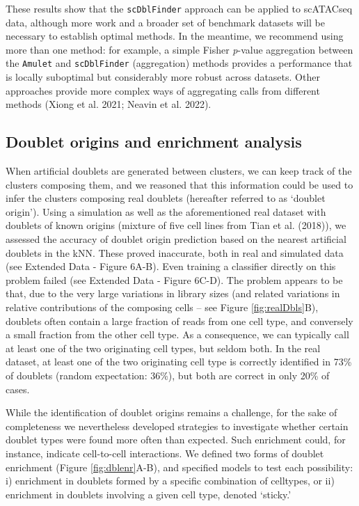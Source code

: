 \documentclass[10pt,a4paper,twocolumn]{article}
\begin{document}
These results show that the \texttt{scDblFinder} approach can be applied to scATACseq data, although more work and a broader set of benchmark datasets will be necessary to establish optimal methods. In the meantime, we recommend using more than one method: for example, a simple Fisher \emph{p}-value aggregation between the \texttt{Amulet} and \texttt{scDblFinder} (aggregation) methods provides a performance that is locally suboptimal but considerably more robust across datasets. Other approaches provide more complex ways of aggregating calls from different methods (Xiong et al. 2021; Neavin et al. 2022).


\subsection{Doublet origins and enrichment analysis}

When artificial doublets are generated between clusters, we can keep track of the clusters composing them, and we reasoned that this information could be used to infer the clusters composing real doublets (hereafter referred to as `doublet origin'). Using a simulation as well as the aforementioned real dataset with doublets of known origins (mixture of five cell lines from Tian et al. (2018)), we assessed the accuracy of doublet origin prediction based on the nearest artificial doublets in the kNN. These proved inaccurate, both in real and simulated data (see Extended Data - Figure 6A-B). Even training a classifier directly on this problem failed (see Extended Data - Figure 6C-D).
The problem appears to be that, due to the very large variations in library sizes (and related variations in relative contributions of the composing cells -- see Figure \ref{fig:realDbls}B), doublets often contain a large fraction of reads from one cell type, and conversely a small fraction from the other cell type.
As a consequence, we can typically call at least one of the two originating cell types, but seldom both.
In the real dataset, at least one of the two originating cell type is correctly identified in 73\% of doublets (random expectation: 36\%), but both are correct in only 20\% of cases.

While the identification of doublet origins remains a challenge, for the sake of completeness we nevertheless developed strategies to investigate whether certain doublet types were found more often than expected.
Such enrichment could, for instance, indicate cell-to-cell interactions.
We defined two forms of doublet enrichment (Figure \ref{fig:dblenr}A-B), and specified models to test each possibility:
i) enrichment in doublets formed by a specific combination of celltypes, or
ii) enrichment in doublets involving a given cell type, denoted `sticky.'
\end{document}
